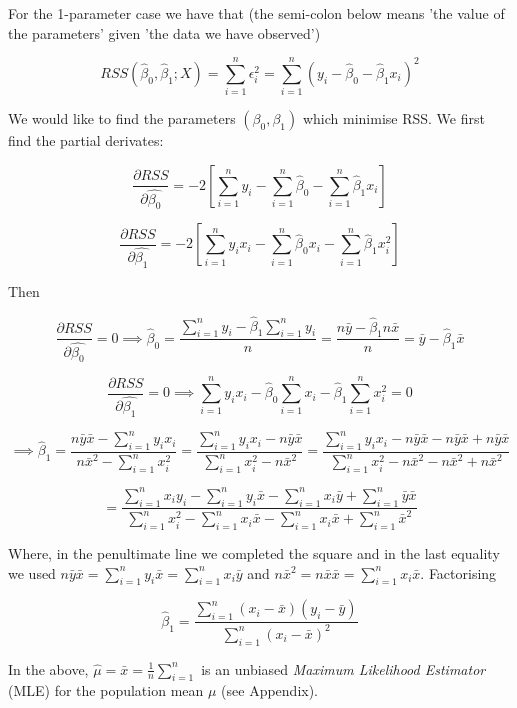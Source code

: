 \documentclass[11pt]{article}
\begin{document}
For the 1-parameter case we have that (the semi-colon below means 'the
value of the parameters' given 'the data we have observed')

\[RSS(\hat{\beta}_0,\hat{\beta}_1;X) = \sum_{i=1}^n \epsilon_i^2 = \sum_{i=1}^n (y_i-\hat{\beta}_0 - \hat{\beta}_1 x_i)^2\]

We would like to find the parameters \((\beta_0,\beta_1)\) which
minimise RSS. We first find the partial derivates:

\[\frac{\partial RSS}{\partial \hat{\beta_0}} = -2 [ \sum_{i=1}^n y_i - \sum_{i=1}^n \hat{\beta}_0 - \sum_{i=1}^n \hat{\beta}_1 x_i]\]

\[\frac{\partial RSS}{\partial \hat{\beta_1}} = -2 [ \sum_{i=1}^n y_i x_i - \sum_{i=1}^n \hat{\beta}_0 x_i - \sum_{i=1}^n \hat{\beta}_1 x_i^2]\]

Then

\[\frac{\partial RSS}{\partial \hat{\beta_0}} = 0 \implies  \hat{\beta}_0 = \frac{\sum_{i=1}^n y_i - \hat{\beta}_1 \sum_{i=1}^n y_i}{n} = \frac{n \bar{y} - \hat{\beta}_1 n \bar{x}}{n} = \bar{y} - \hat{\beta}_1 \bar{x}\]

\[\frac{\partial RSS}{\partial \hat{\beta_1}} = 0 \implies  \sum_{i=1}^n y_i x_i - \hat{\beta}_0 \sum_{i=1}^n x_i - \hat{\beta}_1 \sum_{i=1}^n x_i^2 = 0\]

\[\implies \hat{\beta}_1 = \frac{n \bar{y} \bar{x} - \sum_{i=1}^n y_i x_i}{n \bar{x}^2 - \sum_{i=1}^n x_i^2} = \frac{\sum_{i=1}^n y_i x_i - n \bar{y} \bar{x}}{\sum_{i=1}^n x_i^2 - n \bar{x}^2} = \frac{\sum_{i=1}^n y_i x_i - n \bar{y} \bar{x} - n \bar{y} \bar{x} + n\bar{y} \bar{x}}{\sum_{i=1}^n x_i^2 - n \bar{x}^2 -n\bar{x}^2 + n\bar{x}^2}\]

\[= \frac{\sum_{i=1}^n x_i y_i - \sum_{i=1}^n y_i \bar{x} - \sum_{i=1}^n x_i \bar{y}  + \sum_{i=1}^n \bar{y} \bar{x}}{\sum_{i=1}^n x_i^2 - \sum_{i=1}^n x_i \bar{x} - \sum_{i=1}^n x_i \bar{x} + \sum_{i=1}^n \bar{x}^2}\]

Where, in the penultimate line we completed the square and in the last
equality we used
\(n\bar{y} \bar{x} = \sum_{i=1}^n y_i \bar{x} = \sum_{i=1}^n x_i \bar{y}\)
and \(n\bar{x}^2 = n\bar{x} \bar{x} = \sum_{i=1}^n x_i \bar{x}\).
Factorising

\[\hat{\beta}_1 = \frac{\sum_{i=1}^n (x_i - \bar{x})(y_i - \bar{y})}{\sum_{i=1}^n (x_i - \bar{x})^2}\]

In the above, \(\hat{\mu} = \bar{x} = \frac{1}{n} \sum_{i=1}^n\) is an
unbiased \emph{Maximum Likelihood Estimator} (MLE) for the population
mean \(\mu\) (see Appendix).
\end{document}

